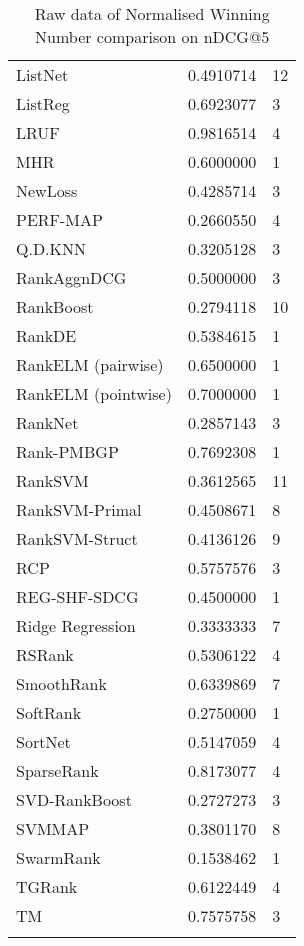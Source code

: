 \begin{longtable}{l|l|l}
ListNet & 0.4910714 & 12 \\ 
ListReg & 0.6923077 & 3 \\ 
LRUF & 0.9816514 & 4 \\ 
MHR & 0.6000000 & 1 \\ 
NewLoss & 0.4285714 & 3 \\ 
PERF-\acs{MAP} & 0.2660550 & 4 \\ 
Q.D.KNN & 0.3205128 & 3 \\ 
RankAgg\acs{nDCG} & 0.5000000 & 3 \\ 
RankBoost & 0.2794118 & 10 \\ 
RankDE & 0.5384615 & 1 \\ 
RankELM (pairwise) & 0.6500000 & 1 \\ 
RankELM (pointwise) & 0.7000000 & 1 \\ 
RankNet & 0.2857143 & 3 \\ 
Rank-PMBGP & 0.7692308 & 1 \\ 
Rank\acs{SVM} & 0.3612565 & 11 \\ 
Rank\acs{SVM}-Primal & 0.4508671 & 8 \\ 
Rank\acs{SVM}-Struct & 0.4136126 & 9 \\ 
RCP & 0.5757576 & 3 \\ 
REG-SHF-SDCG & 0.4500000 & 1 \\ 
Ridge Regression & 0.3333333 & 7 \\ 
RSRank & 0.5306122 & 4 \\ 
SmoothRank & 0.6339869 & 7 \\ 
SoftRank & 0.2750000 & 1 \\ 
SortNet & 0.5147059 & 4 \\ 
SparseRank & 0.8173077 & 4 \\ 
\acs{SVD}-RankBoost & 0.2727273 & 3 \\ 
\acs{SVM}\acs{MAP} & 0.3801170 & 8 \\ 
SwarmRank & 0.1538462 & 1 \\ 
TGRank & 0.6122449 & 4 \\ 
TM & 0.7575758 & 3 \\ 
\caption{Raw data of Normalised Winning Number comparison on \acs{nDCG}@5}
\label{winnum_ndcg5}
\end{longtable}